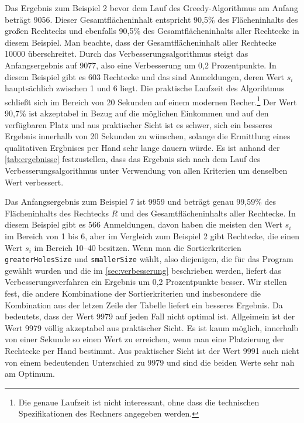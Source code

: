 Das Ergebnis zum Beispiel 2 bevor dem Lauf des Greedy-Algorithmus am Anfang 
beträgt 9056. Dieser Gesamtflächeninhalt entspricht 90,5\% des Flächeninhalts des
großen Rechtecks und ebenfalls 90,5\% des Gesamtflächeninhalts aller Rechtecke in diesem Beispiel.
Man beachte, dass der Gesamtflächeninhalt aller Rechtecke 10000 überschreitet.
Durch das Verbesserungsalgorithmus steigt das Anfangsergebnis auf 9077,
also eine Verbesserung um 0,2 Prozentpunkte.
In diesem Beispiel gibt es 603 Rechtecke und das sind Anmeldungen, deren Wert $s_i$ hauptsächlich zwischen 
1 und 6 liegt. Die praktische Laufzeit des Algorihtmus schließt sich im Bereich von 20 Sekunden
auf einem modernen Recher.\footnote{Die genaue Laufzeit ist nicht interessant, ohne dass die 
technischen Spezifikationen des Rechners angegeben werden.}
Der Wert 90,7\% ist akzeptabel in Bezug auf die möglichen Einkommen und auf den verfügbaren Platz
und aus praktischer Sicht ist es schwer, sich ein besseres Ergebnis innerhalb von 20 Sekunden zu wünschen,
solange die Ermittlung eines qualitativen Ergbnises per Hand sehr lange dauern würde.
Es ist anhand der \cref{tab:ergebnisse} festzustellen, dass das Ergebnis sich nach dem Lauf des
Verbesserungsalgorithmus unter Verwendung von allen Kriterien um denselben Wert verbessert.

Das Anfangsergebnis zum Beispiel 7 ist 9959 und beträgt genau 99,59\% des Flächeninhalts
des Rechtecks $R$ und des Gesamtflächeninhalts aller Rechtecke. In diesem Beispiel
gibt es 566 Anmeldungen, davon haben die meisten den Wert $s_i$ im Bereich von 1 bis 6, aber
im Vergleich zum Beispiel 2 gibt Rechtecke, die einen Wert $s_i$ im Bereich 10--40 besitzen.
Wenn man die Sortierkriterien \texttt{greaterHolesSize} und \texttt{smallerSize} wählt,
also diejenigen, die für das Program gewählt wurden und die im \cref{sec:verbesserung} beschrieben werden,
liefert das Verbesserungsverfahren ein Ergebnis um 0,2 Prozentpunkte besser.
Wir stellen fest, die andere Kombinatione der Sortierkriterien und insbesondere die Kombination
aus der letzen Zeile der Tabelle liefert ein besseres Ergebnis.
Da bedeutets, dass der Wert 9979 auf jeden Fall nicht optimal ist. 
Allgeimein ist der Wert 9979 völlig akzeptabel aus praktischer Sicht.
Es ist kaum möglich, innerhalb von einer Sekunde so einen Wert zu erreichen,
wenn man eine Platzierung der Rechtecke per Hand bestimmt.
Aus praktischer Sicht ist der Wert 9991 auch nicht von einem bedeutenden Unterschied zu 9979 und
sind die beiden Werte sehr nah am Optimum.

